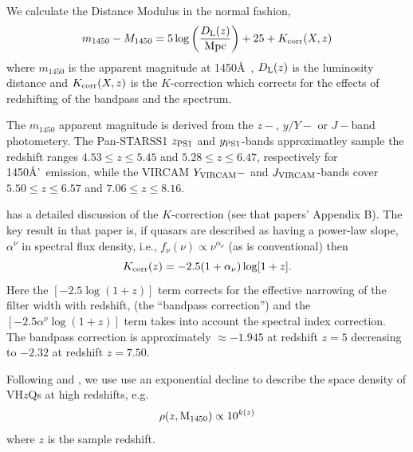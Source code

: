We calculate the Distance Modulus in the normal fashion, 
\begin{equation}
m_{1450} - M_{1450} = 5 \log \left (    \frac{ D_{\rm L}(z)}{\rm Mpc}  \right )  + 25 + K_{\rm corr}(X,z)
\end{equation}
where $m_{1450}$ is the apparent magnitude at 1450\AA\ ,  
$D_{\rm L}(z)$ is the luminosity distance and $K_{\rm corr}(X,z)$ is
the $K$-correction which corrects for the effects of redshifting of
the bandpass and the spectrum.

The $m_{1450}$ apparent magnitude is derived from the $z-$, $y/Y-$ or $J-$band photometery.
The Pan-STARSS1 $z_{\rm PS1}$ and $y_{\rm PS1}$-bands approximatley
sample the redshift ranges $4.53\leq z \leq 5.45$ and $5.28\leq z \leq 6.47$, respectively 
for 1450\AA'\ emission, while the VIRCAM $Y_{\rm VIRCAM}-$ and $J_{\rm VIRCAM}$-bands 
cover $5.50\leq z \leq 6.57$ and $7.06\leq z \leq 8.16$. 

\citet{Ross2013} has a detailed discussion of the $K$-correction (see that papers' Appendix B). 
The key result in that paper is, if quasars are described as having a power-law slope, 
$\alpha^{\nu}$ in spectral flux density, i.e., $f_\nu(\nu) \propto \nu^{\alpha_{\nu}}$ (as is conventional) 
then 
\begin{equation}
K_{\rm corr}(z) = -2.5 (1 + \alpha_{\nu}) \log[1 + z].
\end{equation}
Here the $[-2.5 \log(1 + z)]$ term corrects for the effective narrowing of the filter width with redshift, (the ``bandpass correction'') and the $[-2.5 \alpha^{\nu} \log(1 + z)]$ term takes into account the spectral index correction. The bandpass correction is approximately $\approx -1.945$ at redshift $z=5$ decreasing to $-2.32$ at redshift $z=7.50$. 

Following \citet{Fan2001b} and \citet{McGreer2013}, we use use an
exponential decline to describe the space density of VH$z$Qs at high
redshifts, e.g.
\begin{equation}
\rho(z, {\rm M}_{1450}) \propto 10^{k (z)}
\end{equation}
where $z$ is the sample redshift. 
